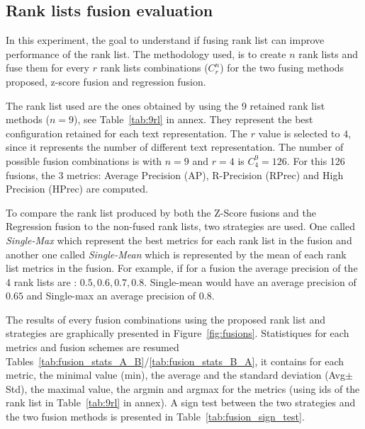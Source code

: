 \subsection{Rank lists fusion evaluation \label{sec:eval_fusion}}

In this experiment, the goal to understand if fusing rank list can improve performance of the rank list.
The methodology used, is to create $n$ rank lists and fuse them for every $r$ rank lists combinations ($C^n_r$) for the two fusing methods proposed, z-score fusion and regression fusion.

The rank list used are the ones obtained by using the 9 retained rank list methods ($n=9$), see Table~\ref{tab:9rl} in annex.
They represent the best configuration retained for each text representation.
The $r$ value is selected to $4$, since it represents the number of different text representation.
The number of possible fusion combinations is with $n=9$ and $r=4$ is $C^{9}_{4} = 126$.
For this 126 fusions, the 3 metrics: Average Precision (AP), R-Precision (RPrec) and High Precision (HPrec) are computed.

To compare the rank list produced by both the Z-Score fusions and the Regression fusion to the non-fused rank lists, two strategies are used.
One called \textit{Single-Max} which represent the best metrics for each rank list in the fusion and another one called \textit{Single-Mean} which is represented by the mean of each rank list metrics in the fusion.
For example, if for a fusion the average precision of the 4 rank lists are : $0.5, 0.6, 0.7, 0.8$. Single-mean would have an average precision of $0.65$ and Single-max an average precision of $0.8$.

The results of every fusion combinations using the proposed rank list and strategies are graphically presented in Figure~\ref{fig:fusions}.
Statistiques for each metrics and fusion schemes are resumed Tables~\ref{tab:fusion_stats_A_B}/\ref{tab:fusion_stats_B_A}, it contains for each metric, the minimal value (min), the average and the standard deviation (Avg$\pm$Std), the maximal value, the argmin and argmax for the metrics (using ids of the rank list in Table~\ref{tab:9rl} in annex).
A sign test between the two strategies and the two fusion methods is presented in Table~\ref{tab:fusion_sign_test}.

